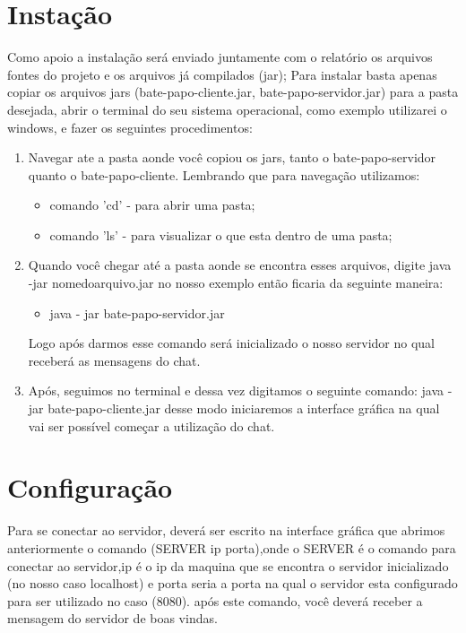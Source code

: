 \documentclass{abnt}
\begin{document}
	\section{Instação}	
	Como apoio a instalação será enviado juntamente com o relatório os arquivos fontes do projeto e os arquivos já compilados (jar); Para instalar basta apenas copiar os arquivos jars (bate-papo-cliente.jar, bate-papo-servidor.jar) para a pasta desejada, abrir o terminal do seu sistema operacional, como exemplo utilizarei o windows, e fazer os seguintes procedimentos:
	\begin{enumerate}
	
	\item  Navegar ate a pasta aonde você copiou os jars, tanto o bate-papo-servidor quanto o bate-papo-cliente.
	Lembrando que para navegação utilizamos: 
	
	\begin{itemize}
	\item comando 'cd' - para abrir uma pasta;
	\item comando 'ls' - para visualizar o que esta dentro de uma pasta;
	\end{itemize}	
	
	\item Quando você chegar até a pasta aonde se encontra esses arquivos, digite java -jar nomedoarquivo.jar
	no nosso exemplo então ficaria da seguinte maneira:
	\begin{itemize}
	\item java - jar bate-papo-servidor.jar
	\end{itemize}
	Logo após darmos esse comando será inicializado o nosso servidor no qual receberá as mensagens do chat.
	
	\item Após, seguimos no terminal e dessa vez digitamos o seguinte comando: java -jar bate-papo-cliente.jar
	desse modo iniciaremos a interface gráfica na qual vai ser possível começar a utilização do chat.
	\end{enumerate}
	
	\section{Configuração}	
	Para se conectar ao servidor, deverá ser escrito na interface gráfica que abrimos anteriormente o comando (SERVER ip porta),onde o SERVER é o comando para conectar ao servidor,ip é o ip da maquina que se encontra o servidor inicializado (no nosso caso localhost) e porta seria a porta na qual o servidor esta configurado para ser utilizado no caso (8080). 
	após este comando, você deverá receber a mensagem do servidor de boas vindas. 	
\end{document}
